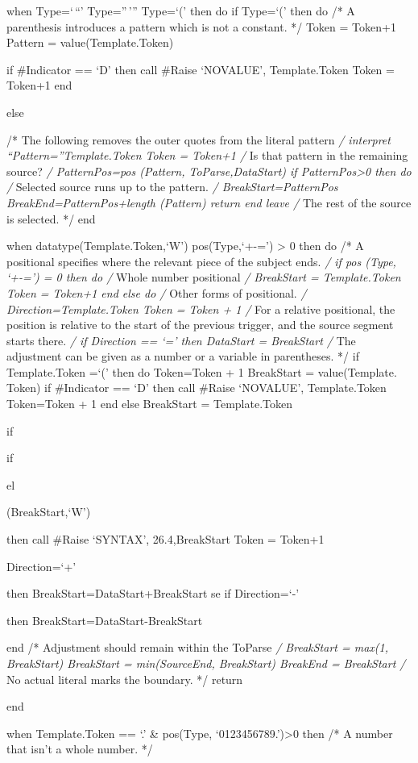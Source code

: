 when Type=`\,``' \textbar{} Type=''\,''' \textbar{} Type=`(' then do if
Type=`(' then do /* A parenthesis introduces a pattern which is not a
constant. */ Token = Token+1 Pattern = value(Template.Token)

if \#Indicator == `D' then call \#Raise `NOVALUE', Template.Token Token
= Token+1 end

else

/* The following removes the outer quotes from the literal pattern
\emph{/ interpret ``Pattern=''Template.Token Token = Token+1 /} Is that
pattern in the remaining source? \emph{/ PatternPos=pos (Pattern,
ToParse,DataStart) if PatternPos\textgreater0 then do /} Selected source
runs up to the pattern. \emph{/ BreakStart=PatternPos
BreakEnd=PatternPos+length (Pattern) return end leave /} The rest of the
source is selected. */ end

when datatype(Template.Token,`W') \textbar{} pos(Type,`+-=')
\textgreater{} 0 then do /* A positional specifies where the relevant
piece of the subject ends. \emph{/ if pos (Type, `+-=') = 0 then do /}
Whole number positional \emph{/ BreakStart = Template.Token Token =
Token+1 end else do /} Other forms of positional. \emph{/
Direction=Template.Token Token = Token + 1 /} For a relative positional,
the position is relative to the start of the previous trigger, and the
source segment starts there. \emph{/ if Direction == `=' then DataStart
= BreakStart /} The adjustment can be given as a number or a variable in
parentheses. */ if Template.Token =`(' then do Token=Token + 1
BreakStart = value(Template. Token) if \#Indicator == `D' then call
\#Raise `NOVALUE', Template.Token Token=Token + 1 end else BreakStart =
Template.Token

if

if

el

\datatype (BreakStart,`W')

then call \#Raise `SYNTAX', 26.4,BreakStart Token = Token+1

Direction=`+'

then BreakStart=DataStart+BreakStart se if Direction=`-'

then BreakStart=DataStart-BreakStart

end /* Adjustment should remain within the ToParse \emph{/ BreakStart =
max(1, BreakStart) BreakStart = min(SourceEnd, BreakStart) BreakEnd =
BreakStart /} No actual literal marks the boundary. */ return

end

when Template.Token == `.' \& pos(Type, `0123456789.')\textgreater0 then
/* A number that isn't a whole number. */

